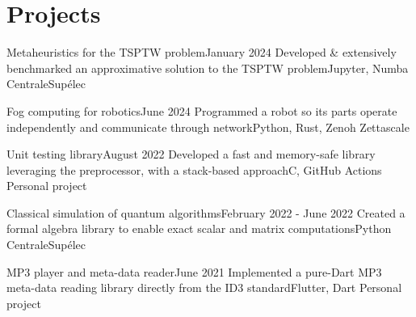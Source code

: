 \section{Projects}
\resumeSubHeadingListStart
    \resumeProjectHeading
    {Metaheuristics for the TSPTW problem}{January 2024}
    {Developed \& extensively benchmarked an approximative solution to the TSPTW problem}{Jupyter, Numba}
    {}
    {CentraleSupélec}

    \resumeProjectHeading
    {Fog computing for robotics}{June 2024}
    {Programmed a robot so its parts operate independently and communicate through network}{Python, Rust, Zenoh}
    {}
    {Zettascale}

    \resumeProjectHeading
    {Unit testing library}{\quad August 2022}
    {Developed a fast and memory-safe library leveraging the preprocessor, with a stack-based approach}{C, GitHub Actions}
    {}
    {Personal project}
    \vspace{-7pt}
    \resumeItemListStart
    \resumeItemListEnd

    \resumeProjectHeading
    {Classical simulation of quantum algorithms}{February 2022 - June 2022}
    {Created a formal algebra library to enable exact scalar and matrix computations}{Python}
    {}
    {CentraleSupélec}
    \vspace{-7pt}
    \resumeItemListStart
    \resumeItemListEnd


    \resumeProjectHeading
    {MP3 player and meta-data reader}{June 2021}
    {Implemented a pure-Dart MP3 meta-data reading library directly from the ID3 standard}{Flutter, Dart}
    {}
    {Personal project}
    \vspace{-7pt}
    \resumeItemListStart
    \resumeItemListEnd


\resumeSubHeadingListEnd
